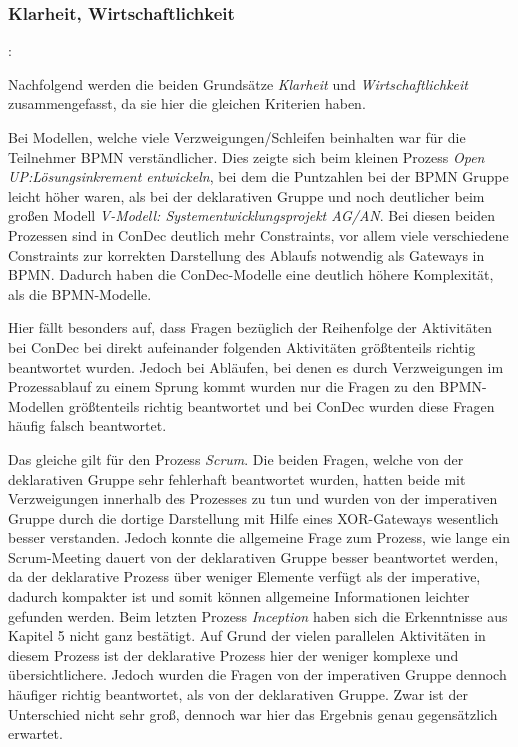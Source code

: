 \subsubsection{Klarheit, Wirtschaftlichkeit}: 

Nachfolgend werden die beiden Grundsätze \textit{Klarheit} und \textit{Wirtschaftlichkeit} zusammengefasst, da sie hier die gleichen Kriterien haben.\newline

Bei Modellen, welche viele Verzweigungen/Schleifen beinhalten war für die Teilnehmer BPMN verständlicher. Dies zeigte sich beim kleinen Prozess \textit{Open UP:Lösungsinkrement entwickeln}, bei dem die Puntzahlen bei der BPMN Gruppe leicht höher waren, als bei der deklarativen Gruppe und noch deutlicher beim großen Modell \textit{V-Modell: Systementwicklungsprojekt AG/AN}. Bei diesen beiden Prozessen sind in ConDec deutlich mehr Constraints, vor allem viele verschiedene Constraints zur korrekten Darstellung des Ablaufs notwendig als Gateways in BPMN. Dadurch haben die ConDec-Modelle eine deutlich höhere Komplexität, als die BPMN-Modelle.\newline

Hier fällt besonders auf, dass Fragen bezüglich der Reihenfolge der Aktivitäten bei ConDec bei direkt aufeinander folgenden Aktivitäten größtenteils richtig beantwortet wurden. Jedoch bei Abläufen, bei denen es durch Verzweigungen im Prozessablauf zu einem Sprung kommt wurden nur die Fragen zu den BPMN-Modellen größtenteils richtig beantwortet und bei ConDec wurden diese Fragen häufig falsch beantwortet.\newline

Das gleiche gilt für den Prozess \textit{Scrum}. Die beiden Fragen, welche von der deklarativen Gruppe sehr fehlerhaft beantwortet wurden, hatten beide mit Verzweigungen innerhalb des Prozesses zu tun und wurden von der imperativen Gruppe durch die dortige Darstellung mit Hilfe eines XOR-Gateways wesentlich besser verstanden. Jedoch konnte die allgemeine Frage zum Prozess, wie lange ein Scrum-Meeting dauert von der deklarativen Gruppe besser beantwortet werden, da der deklarative Prozess über weniger Elemente verfügt als der imperative, dadurch kompakter ist und somit können allgemeine Informationen leichter gefunden werden. \newline
Beim letzten Prozess \textit{Inception} haben sich die Erkenntnisse aus Kapitel 5 nicht ganz bestätigt. Auf Grund der vielen parallelen Aktivitäten in diesem Prozess ist der deklarative Prozess hier der weniger komplexe und übersichtlichere. Jedoch wurden die Fragen von der imperativen Gruppe dennoch häufiger richtig beantwortet, als von der deklarativen Gruppe. Zwar ist der Unterschied nicht sehr groß, dennoch war hier das Ergebnis genau gegensätzlich erwartet.\newline

